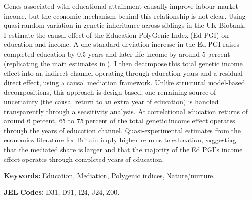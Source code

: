\noindent
Genes associated with educational attainment causally improve labour market income, but the economic mechanism behind this relationship is not clear.
Using quasi-random variation in genetic inheritance across siblings in the UK Biobank, I estimate the causal effect of the Education PolyGenic Index (Ed PGI) on education and income.
A one standard deviation increase in the Ed PGI raises completed education by 0.5 years and later-life income by around 5 percent (replicating the main estimates in \citealt{carvalho2024genetics}).
I then decompose this total genetic income effect into an indirect channel operating through education years and a residual direct effect, using a causal mediation framework.
Unlike structural model-based decompositions, this approach is design-based;
one remaining source of uncertainty (the causal return to an extra year of education) is handled transparently through a sensitivity analysis.
At correlational education returns of around 6 percent, 65 to 75 percent of the total genetic income effect operates through the years of education channel.
Quasi-experimental estimates from the economics literature for Britain imply higher returns to education, suggesting that the mediated share is larger and that the majority of the Ed PGI's income effect operates through completed years of education.

\vspace{0.25cm}
\noindent
\textbf{Keywords:}
Education,
Mediation,
Polygenic indices,
Nature/nurture.

\vspace{0.1cm}
\noindent
\textbf{JEL Codes:}
D31, D91, I24, J24, Z00.
